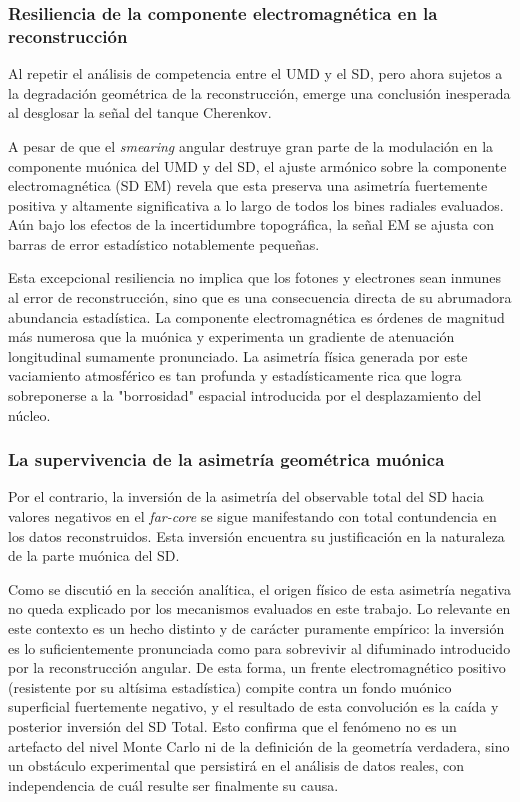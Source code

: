 \subsubsection{Resiliencia de la componente electromagnética en la reconstrucción}

Al repetir el análisis de competencia entre el UMD y el SD, pero ahora sujetos a la degradación geométrica de la reconstrucción, emerge una conclusión inesperada al desglosar la señal del tanque Cherenkov. 

A pesar de que el \textit{smearing} angular destruye gran parte de la modulación en la componente muónica del UMD y del SD, el ajuste armónico sobre la componente electromagnética (SD EM) revela que esta preserva una asimetría fuertemente positiva y altamente significativa a lo largo de todos los bines radiales evaluados. Aún bajo los efectos de la incertidumbre topográfica, la señal EM se ajusta con barras de error estadístico notablemente pequeñas.

Esta excepcional resiliencia no implica que los fotones y electrones sean inmunes al error de reconstrucción, sino que es una consecuencia directa de su abrumadora abundancia estadística. La componente electromagnética es órdenes de magnitud más numerosa que la muónica y experimenta un gradiente de atenuación longitudinal sumamente pronunciado. La asimetría física generada por este vaciamiento atmosférico es tan profunda y estadísticamente rica que logra sobreponerse a la "borrosidad" espacial introducida por el desplazamiento del núcleo.

\subsubsection{La supervivencia de la asimetría geométrica muónica}

Por el contrario, la inversión de la asimetría del observable total del SD hacia valores negativos en el \textit{far-core} se sigue manifestando con total contundencia en los datos reconstruidos. Esta inversión encuentra su justificación en la naturaleza de la parte muónica del SD.

Como se discutió en la sección analítica, el origen físico de esta asimetría negativa no queda explicado por los mecanismos evaluados en este trabajo. Lo relevante en este contexto es un hecho distinto y de carácter puramente empírico: la inversión es lo suficientemente pronunciada como para sobrevivir al difuminado introducido por la reconstrucción angular. De esta forma, un frente electromagnético positivo (resistente por su altísima estadística) compite contra un fondo muónico superficial fuertemente negativo, y el resultado de esta convolución es la caída y posterior inversión del SD Total. Esto confirma que el fenómeno no es un artefacto del nivel Monte Carlo ni de la definición de la geometría verdadera, sino un obstáculo experimental que persistirá en el análisis de datos reales, con independencia de cuál resulte ser finalmente su causa.

